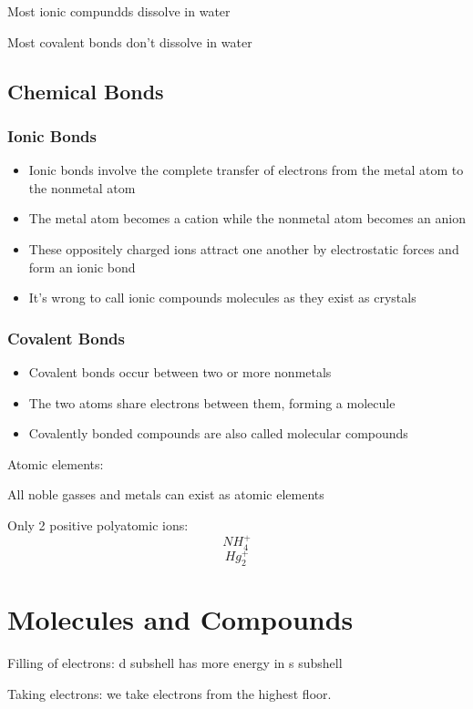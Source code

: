 \documentclass[openany]{book}
\begin{document}
Most ionic compundds dissolve in water

Most covalent bonds don't dissolve in water

\section{Chemical Bonds}

\subsection{Ionic Bonds}

\begin{itemize}
	\item Ionic bonds involve the complete transfer of electrons from the metal atom to the nonmetal atom
	\item The metal atom becomes a cation while the nonmetal atom becomes an anion
	\item These oppositely charged ions attract one another by electrostatic forces and form an ionic bond
	\item It's wrong to call ionic compounds molecules as they exist as crystals
\end{itemize}

\subsection{Covalent Bonds}

\begin{itemize}
	\item Covalent bonds occur between two or more nonmetals
	\item The two atoms share electrons between them, forming a molecule
	\item Covalently bonded compounds are also called molecular compounds
\end{itemize}

Atomic elements:

All noble gasses and metals can exist as atomic elements

Only 2 positive polyatomic ions:
\[
	NH_4^+
\]
\[Hg_2^+\]

\chapter{Molecules and Compounds}

Filling of electrons:
d subshell has more energy in s subshell

Taking electrons:
we take electrons from the highest floor.
\end{document}
